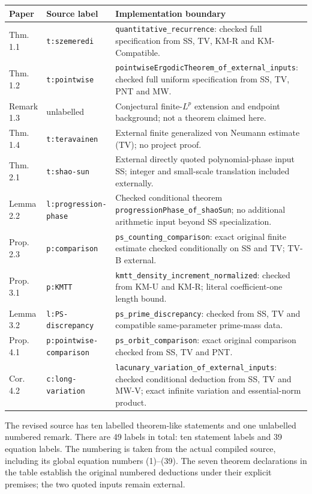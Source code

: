 \begin{longtable}{@{}p{18mm}p{41mm}p{86mm}@{}}
\toprule Paper & Source label & Implementation boundary\\\midrule\endhead
Thm. 1.1 & \texttt{t:szemeredi} & \texttt{quantitative\_recurrence}: checked full specification from SS, TV, KM-R and KM-Compatible.\\
Thm. 1.2 & \texttt{t:pointwise} & \texttt{pointwiseErgodicTheorem\_of\_external\_inputs}: checked full uniform specification from SS, TV, PNT and MW.\\
Remark 1.3 & unlabelled & Conjectural finite-$L^p$ extension and endpoint background; not a theorem claimed here.\\
Thm. 1.4 & \texttt{t:teravainen} & External finite generalized von Neumann estimate (TV); no project proof.\\
Thm. 2.1 & \texttt{t:shao-sun} & External directly quoted polynomial-phase input SS; integer and small-scale translation included externally.\\
Lemma 2.2 & \texttt{l:progression-phase} & Checked conditional theorem \texttt{progressionPhase\_of\_shaoSun}; no additional arithmetic input beyond SS specialization.\\
Prop. 2.3 & \texttt{p:comparison} & \texttt{ps\_counting\_comparison}: exact original finite estimate checked conditionally on SS and TV; TV-B external.\\
Prop. 3.1 & \texttt{p:KMTT} & \texttt{kmtt\_density\_increment\_normalized}: checked from KM-U and KM-R; literal coefficient-one length bound.\\
Lemma 3.2 & \texttt{l:PS-discrepancy} & \texttt{ps\_prime\_discrepancy}: checked from SS, TV and compatible same-parameter prime-mass data.\\
Prop. 4.1 & \texttt{p:pointwise-comparison} & \texttt{ps\_orbit\_comparison}: exact original comparison checked from SS, TV and PNT.\\
Cor. 4.2 & \texttt{c:long-variation} & \texttt{lacunary\_variation\_of\_external\_inputs}: checked conditional deduction from SS, TV and MW-V; exact infinite variation and essential-norm product.\\
\bottomrule
\end{longtable}
\normalsize
The revised source has ten labelled theorem-like statements and one unlabelled numbered remark. There are 49 labels in total: ten statement labels and 39 equation labels. The numbering is taken from the actual compiled source, including its global equation numbers (1)--(39). The seven theorem declarations in the table establish the original numbered deductions under their explicit premises; the two quoted inputs remain external.

\fi
